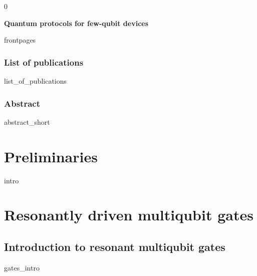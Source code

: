 \documentclass[12pt,twoside]{book}
\def\printversion{0}
\providecommand{\mypart}[1]{\part{#1}}
\theoremstyle{definition}
\newcommand{\thetitle}{\LARGE \textbf{Quantum protocols for few-qubit devices}}
\begin{document}
\if\printversion0

\fi

\frontmatter



\thispagestyle{empty}
\begin{center}
\vspace*{4cm}
{ \thetitle } \\[1cm] %
\end{center}



{frontpages}


\clearpage
\section*{List of publications}
{list_of_publications}


\clearpage
\section*{Abstract}
{abstract_short}



\clearpage
\setcounter{tocdepth}{1}
\tableofcontents



\mainmatter


\mypart{Preliminaries}
\label{part:preliminaries}


\clearpage
{intro}




\mypart{Resonantly driven multiqubit gates}
\label{part:multiqubit}

\chapter{Introduction to resonant multiqubit gates}
\label{chap:gates_intro}
\graphicspath{{./1__gate_intro/img/}}
{gates_intro}
\end{document}
